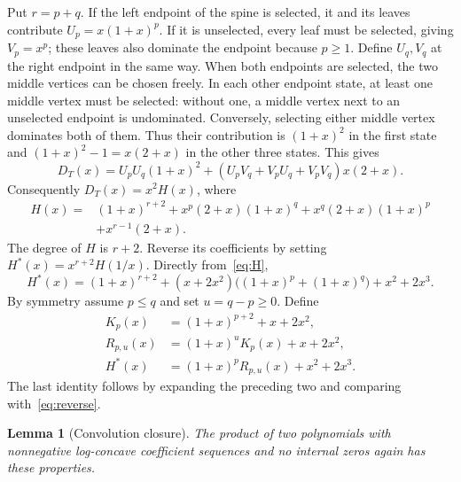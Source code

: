 \documentclass[11pt,a4paper]{article}
\newtheorem{lemma}[theorem]{Lemma}
\begin{document}
Put $r=p+q$. If the left endpoint of the spine is selected, it and its
leaves contribute $U_p=x(1+x)^p$. If it is unselected, every leaf must be
selected, giving $V_p=x^p$; these leaves also dominate the endpoint because
$p\geq1$. Define $U_q,V_q$ at the right endpoint in the same way.
When both endpoints are selected, the two middle vertices can be chosen
freely. In each other endpoint state, at least one middle vertex must be
selected: without one, a middle vertex next to an unselected endpoint is
undominated. Conversely, selecting either middle vertex dominates both of
them. Thus their contribution is $(1+x)^2$ in the first state and
$(1+x)^2-1=x(2+x)$ in the other three states. This gives
\[
 D_T(x)=U_pU_q(1+x)^2+(U_pV_q+V_pU_q+V_pV_q)x(2+x).
\]
Consequently $D_T(x)=x^2H(x)$, where
\begin{equation}\label{eq:H}
\begin{split}
 H(x)={}&(1+x)^{r+2}
       +x^p(2+x)(1+x)^q+x^q(2+x)(1+x)^p\\
       &+x^{r-1}(2+x).
\end{split}
\end{equation}
The degree of $H$ is $r+2$. Reverse its coefficients by setting
$H^*(x)=x^{r+2}H(1/x)$. Directly from~\eqref{eq:H},
\begin{equation}\label{eq:reverse}
 H^*(x)=(1+x)^{r+2}
 +(x+2x^2)\bigl((1+x)^p+(1+x)^q\bigr)+x^2+2x^3.
\end{equation}
By symmetry assume $p\leq q$ and set $u=q-p\geq0$. Define
\begin{equation}\label{eq:nested}
\begin{aligned}
 K_p(x)&=(1+x)^{p+2}+x+2x^2,\\
 R_{p,u}(x)&=(1+x)^uK_p(x)+x+2x^2,\\
 H^*(x)&=(1+x)^pR_{p,u}(x)+x^2+2x^3.
\end{aligned}
\end{equation}
The last identity follows by expanding the preceding two and comparing
with~\eqref{eq:reverse}.

\begin{lemma}[Convolution closure]\label{lem:convolution}
The product of two polynomials with nonnegative log-concave coefficient
sequences and no internal zeros again has these properties.
\end{lemma}
\end{document}
